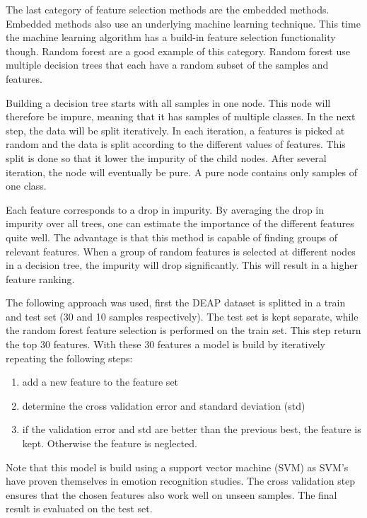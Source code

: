 \documentclass[12pt,journal,compsoc]{IEEEtran}
\newcommand{\npar}{\par \vspace{2.3ex plus 0.3ex minus 0.3ex}}
\begin{document}
\npar

The last category of feature selection methods are the embedded methods. Embedded methods also use an underlying machine learning technique. This time the machine learning algorithm has a build-in feature selection functionality though. Random forest are a good example of this category. Random forest use multiple decision trees that each have a random subset of the samples and features.

\npar

Building a decision tree starts with all samples in one node. This node will therefore be impure, meaning that it has samples of multiple classes. In the next step, the data will be split iteratively. In each iteration, a features is picked at random and the data is split according to the different values of features. This split is done so that it lower the impurity of the child nodes. After several iteration, the node will eventually be pure. A pure node contains only samples of one class. %

\npar

Each feature corresponds to a drop in impurity. By averaging the drop in impurity over all trees, one can estimate the importance of the different features quite well. The advantage is that this method is capable of finding groups of relevant features. When a group of random features is selected at different nodes in a decision tree, the impurity will drop significantly. This will result in a higher feature ranking.

\npar

The following approach was used, first the DEAP dataset is splitted in a train and test set (30 and 10 samples respectively). The test set is kept separate, while the random forest feature selection is performed on the train set. This step return the top 30 features. With these 30 features a model is build by iteratively repeating the following steps:
\begin{enumerate}
\item add a new feature to the feature set
\item determine the cross validation error and standard deviation (std)
\item if the validation error and std are better than the previous best, the feature is kept. Otherwise the feature is neglected.
\end{enumerate}
Note that this model is build using a support vector machine (SVM) as SVM's have proven themselves in emotion recognition studies. The cross validation step ensures that the chosen features also work well on unseen samples. The final result is evaluated on the test set.
\end{document}
